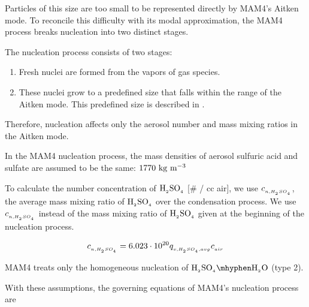 Particles of this size are too small to be represented directly by MAM4's Aitken
mode. To reconcile this difficulty with its modal approximation, the MAM4
process breaks nucleation into two distinct stages.

\begin{assume}
  The nucleation process consists of two stages:
  \begin{enumerate}
    \item Fresh nuclei are formed from the vapors of gas species.
    \item These nuclei grow to a predefined size that falls within the range
      of the Aitken mode. This predefined size is described in
      .
  \end{enumerate}
  Therefore, nucleation affects only the aerosol number and mass mixing ratios
  in the Aitken mode.
\end{assume}

\begin{assume}
  In the MAM4 nucleation process, the mass densities of aerosol sulfuric acid
  and sulfate are assumed to be the same: $\rm 1770~kg~m^{-3}$
\end{assume}

\begin{assume}
  To calculate the number concentration of $\rm H_{_2}SO_{_4}$ [\# / cc air], we use
  $c_{_{n,H_{_2}SO_{_4}}}$, the average mass mixing ratio of $\rm H_{_2}SO_{_4}$ over the
  condensation process. We use $c_{_{n, H_{_2}SO_{_4}}}$ instead of the mass mixing
  ratio of $\rm H_{_2}SO_{_4}$ given at the beginning of the nucleation process.

  $$c_{_{n,H_{_2}SO_{_4}}} = 6.023 \cdot 10^{20} q_{_{v,H_{_2}SO_{_4},avg}} c_{_{air}}$$

\end{assume}


\begin{assume}
  MAM4 treats only the homogeneous nucleation of $\rsag \mhyphen \rwater$
  (type 2).
\end{assume}

With these assumptions, the governing equations of MAM4's nucleation process
are

